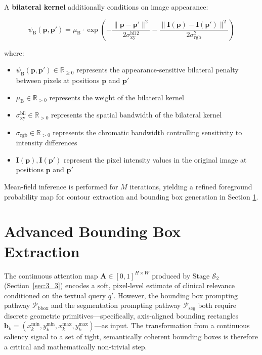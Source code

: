 A \textbf{bilateral kernel} additionally conditions on image appearance:

$$
\psi_{\text{B}}(\mathbf{p}, \mathbf{p}') = \mu_{\text{B}} \cdot \exp\!\left(-\frac{\|\mathbf{p} - \mathbf{p}'\|^2}{2\sigma_{\text{xy}}^{\text{bil}\,2}} - \frac{\|\mathbf{I}(\mathbf{p}) - \mathbf{I}(\mathbf{p}')\|^2}{2\sigma_{\text{rgb}}^2}\right)
$$

where:
\begin{itemize}
\item $\psi_{\text{B}}(\mathbf{p}, \mathbf{p}') \in \mathbb{R}_{\geq 0}$ represents the appearance-sensitive bilateral penalty between pixels at positions $\mathbf{p}$ and $\mathbf{p}'$
\item $\mu_{\text{B}} \in \mathbb{R}_{>0}$ represents the weight of the bilateral kernel
\item $\sigma_{\text{xy}}^{\text{bil}} \in \mathbb{R}_{>0}$ represents the spatial bandwidth of the bilateral kernel
\item $\sigma_{\text{rgb}} \in \mathbb{R}_{>0}$ represents the chromatic bandwidth controlling sensitivity to intensity differences
\item $\mathbf{I}(\mathbf{p}), \mathbf{I}(\mathbf{p}')$ represent the pixel intensity values in the original image at positions $\mathbf{p}$ and $\mathbf{p}'$
\end{itemize}

Mean-field inference is performed for $M$ iterations, yielding a refined foreground probability map for contour extraction and bounding box generation in Section \ref{sec:3_4}.


\section{Advanced Bounding Box Extraction}
\label{sec:3_4}

The continuous attention map $\mathbf{A} \in [0,1]^{H \times W}$ produced by Stage $\mathcal{S}_2$ (Section~\ref{sec:3_3}) encodes a soft, pixel-level estimate of clinical relevance conditioned on the textual query $q'$. However, the bounding box prompting pathway $\mathcal{P}_{\text{bbox}}$ and the segmentation prompting pathway $\mathcal{P}_{\text{seg}}$ both require discrete geometric primitives---specifically, axis-aligned bounding rectangles $\mathbf{b}_k = (x_k^{\min}, y_k^{\min}, x_k^{\max}, y_k^{\max})$---as input. The transformation from a continuous saliency signal to a set of tight, semantically coherent bounding boxes is therefore a critical and mathematically non-trivial step.

